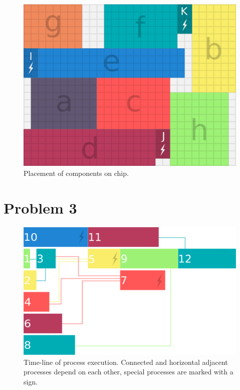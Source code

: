 \documentclass[a4paper]{article}
\begin{document}
	\begin{figure}[H]
		\centering
			\includegraphics[scale=0.7]{power-grid-3.png}
		\caption{Placement of components on chip.}
	\end{figure}
	\section{Problem 3}
	\begin{figure}[H]
		\centering
			\includegraphics[scale=0.7]{timeline.png}
		\caption{Time-line of process execution. Connected and horizontal adjacent processes depend on each other, special processes are marked with a sign.}
	\end{figure}
	
\end{document}
